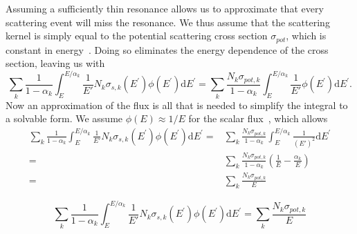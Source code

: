 \documentclass[10pt]{article}
\begin{document}
Assuming a sufficiently thin resonance allows us to approximate that every scattering event will miss the resonance. We thus assume that the scattering kernel is simply equal to the potential scattering cross section $\sigma_{pot}$, which is constant in energy~\cite{ch9}. Doing so eliminates the energy dependence of the cross section, leaving us with
\begin{equation}\sum\limits_{k}\frac{1}{1-\alpha_{k}}\int_{E}^{E/\alpha_{k}}\frac{1}{E'}N_{k}\sigma_{s,k}\left(E^{\prime}\right)\phi\left(E^{\prime}\right)\mathrm{d}E^{\prime}=\sum\limits_{k}\frac{N_k\sigma_{pot,k}}{1-\alpha_{k}}\int_{E}^{E/\alpha_{k}}\frac{1}{E'}\phi\left(E^{\prime}\right)\mathrm{d}E^{\prime}.\end{equation}
  Now an approximation of the flux is all that is needed to simplify the integral to a solvable form. We assume $\phi(E)\approx1/E$ for the scalar flux~\cite{ch9}, which allows 
\begin{align}\sum\limits_{k}\frac{1}{1-\alpha_{k}}\int_{E}^{E/\alpha_{k}}\frac{1}{E'}N_{k}\sigma_{s,k}\left(E^{\prime}\right)\phi\left(E^{\prime}\right)\mathrm{d}E^{\prime} 
  =&\sum\limits_{k}\frac{N_k\sigma_{pot,k}}{1-\alpha_{k}}\int_{E}^{E/\alpha_{k}}\frac{1}{(E')^2}\mathrm{d}E^{\prime}\\
  = &\sum\limits_{k}\frac{N_{k}\sigma_{pot,k}}{1-\alpha_{k}}\left(\frac{1}{E}-\frac{\alpha_k}{E}\right)\\
    =&\sum\limits_k\frac{N_{k}\sigma_{pot,k}}{E}
\end{align}


\begin{equation}\sum\limits_{k}\frac{1}{1-\alpha_{k}}\int_{E}^{E/\alpha_{k}}\frac{1}{E'}N_{k}\sigma_{s,k}\left(E^{\prime}\right)\phi\left(E^{\prime}\right)\mathrm{d}E^{\prime} =\sum\limits_k\frac{N_{k}\sigma_{pot,k}}{E}\label{eq:NRConclusion}\end{equation}
\end{document}
